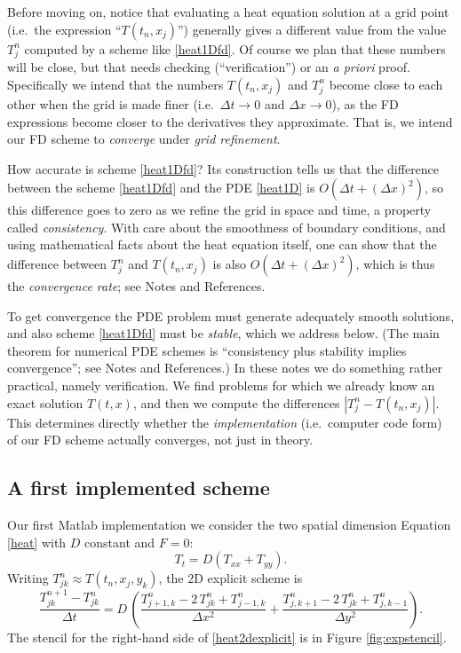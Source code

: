 \documentclass[letterpaper,final,12pt,reqno]{amsart}
\begin{document}
Before moving on, notice that evaluating a heat equation solution at a grid point (i.e.~the expression ``$T(t_n,x_j)$'') generally gives a different value from the value $T_j^n$ computed by a scheme like \eqref{heat1Dfd}.  Of course we plan that these numbers will be close, but that needs checking (``verification'') or an \emph{a priori} proof.  Specifically we intend that the numbers $T(t_n,x_j)$ and $T_j^n$ become close to each other when the grid is made finer (i.e.~$\Delta t \to 0$ and $\Delta x \to 0$), as the FD expressions become closer to the derivatives they approximate.  That is, we intend our FD scheme to \emph{converge} under \emph{grid refinement}.

How accurate is scheme \eqref{heat1Dfd}?  Its construction tells us that the difference between the scheme \eqref{heat1Dfd} and the PDE \eqref{heat1D} is $O(\Delta t + (\Delta x)^2)$, so this difference goes to zero as we refine the grid in space and time, a property called \emph{consistency}.  With care about the smoothness of boundary conditions, and using mathematical facts about the heat equation itself, one can show that the difference between $T_j^n$ and $T(t_n,x_j)$ is also $O(\Delta t + (\Delta x)^2)$, which is thus the \emph{convergence rate}; see Notes and References.

To get convergence the PDE problem must generate adequately smooth solutions, and also scheme \eqref{heat1Dfd} must be \emph{stable}, which we address below.  (The main theorem for numerical PDE schemes is ``consistency plus stability implies convergence''; see Notes and References.)  In these notes we do something rather practical, namely verification.  We find problems for which we already know an exact solution $T(t,x)$, and then we compute the differences $|T_j^n - T(t_n,x_j)|$.  This determines directly whether the \emph{implementation} (i.e.~computer code form) of our FD scheme actually converges, not just in theory.

\subsection*{A first implemented scheme}  Our first Matlab implementation we consider the two spatial dimension Equation \eqref{heat} with $D$ constant and $F=0$:
\begin{equation}
T_t = D (T_{xx}+T_{yy}).\label{heat2D}
\end{equation}
Writing $T_{jk}^n \approx T(t_n,x_j,y_k)$, the 2D explicit scheme is
\begin{equation}
	\frac{T_{jk}^{n+1} - T_{jk}^n}{\Delta t} = D\,\left(\frac{T_{j+1,k}^n - 2\, T_{jk}^n + T_{j-1,k}^n}{\Delta x^2} + \frac{T_{j,k+1}^n - 2\, T_{jk}^n + T_{j,k-1}^n}{\Delta y^2}\right). \label{heat2dexplicit}
\end{equation}
The stencil for the right-hand side of \eqref{heat2dexplicit} is in Figure \ref{fig:expstencil}.
\end{document}
